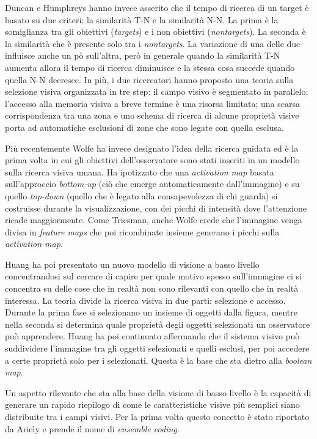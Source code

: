 \documentclass[%
	corpo=12pt,
    twoside,
    stile=classica,
    oldstyle,
    tipotesi=custom,
    greek,
    evenboxes,
]{toptesi}
\begin{document}
{Duncan e Humphreys hanno invece asserito che il tempo di ricerca di un target è basato su due criteri: la similarità T-N e la similarità N-N. La prima è la somiglianza tra gli obiettivi (\textit{targets}) e i non obiettivi (\textit{nontargets}). La seconda è la similarità che è presente solo tra i \textit{nontargets}. La variazione di una delle due influisce anche un pò sull'altra, però in generale quando la similarità T-N aumenta allora il tempo di ricerca diminuisce e la stessa cosa succede quando quella N-N decresce. In più, i due ricercatori hanno proposto una teoria sulla selezione visiva organizzata in tre step: il campo visivo è segmentato in parallelo; l'accesso alla memoria visiva a breve termine è una risorsa limitata; una scarsa corrispondenza tra una zona e uno schema di ricerca di alcune proprietà visive porta ad automatiche esclusioni di zone che sono legate con quella esclusa.

Più recentemente Wolfe ha invece designato l'idea della ricerca guidata ed è la prima volta in cui gli obiettivi dell'osservatore sono stati inseriti in un modello sulla ricerca visiva umana. Ha ipotizzato che una \textit{activation map} basata sull'approccio \textit{bottom-up} (ciò che emerge automaticamente dall'immagine) e su quello \textit{top-down} (quello che è legato alla consapevolezza di chi guarda) si costruisse durante la visualizzazione, con dei picchi di intensità dove l'attenzione ricade maggiormente. Come Triesman, anche Wolfe crede che l'immagine venga divisa in \textit{feature maps} che poi ricombinate insieme generano i picchi sulla \textit{activation map}.

Huang ha poi presentato un nuovo modello di visione a basso livello concentrandosi sul cercare di capire per quale motivo spesso sull'immagine ci si concentra su delle cose che in realtà non sono rilevanti con quello che in realtà interessa. La teoria divide la ricerca visiva in due parti: selezione e accesso. Durante la prima fase si selezionano un insieme di oggetti dalla figura, mentre nella seconda si determina quale proprietà degli oggetti selezionati un osservatore può apprendere. Huang ha poi continuato affermando che il sistema visivo può suddividere l'immagine tra gli oggetti selezionati e quelli esclusi, per poi accedere a certe proprietà solo per i selezionati. Questa è la base che sta dietro alla \textit{boolean map}.

Un aspetto rilevante che sta alla base della visione di basso livello è la capacità di generare un rapido riepilogo di come le caratteristiche visive più semplici siano distribuite tra i campi visivi. Per la prima volta questo concetto è stato riportato da Ariely e prende il nome di \textit{ensemble coding}. 

}
\end{document}
